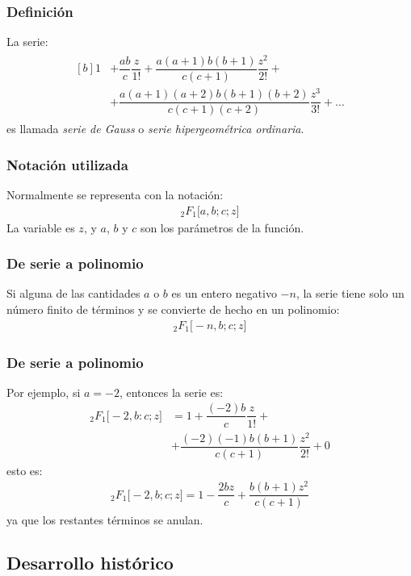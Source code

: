 \documentclass[12pt]{beamer}
\begin{document}
\begin{frame}
\frametitle{Definición}
La serie:
\pause
\begin{align}
\begin{aligned}[b]
1 &+ \dfrac{a b}{c} \dfrac{z}{1!} + \dfrac{a (a {+} 1) b (b {+} 1)}{c( c {+} 1)} \dfrac{z^{2}}{2!} + \\[0.5em]
&+ \dfrac{a (a {+} 1)(a {+} 2) b (b {+} 1)(b {+} 2)}{c (c {+} 1)(c {+} 2)} \dfrac{z^{3}}{3!} + \ldots
\end{aligned}
\label{eq:ecuacion_01_01_01}
\end{align}
es llamada \emph{serie de Gauss} o \emph{serie hipergeométrica ordinaria}.
\end{frame}
\begin{frame}
\frametitle{Notación utilizada}
Normalmente se representa con la notación:
\pause
\begin{align*}
{}_{2} F_{1} \big[ a, b; c; z \big]
\end{align*}
La variable es $z$, y $a$, $b$ y $c$ son los parámetros  de la función.
\end{frame}
\begin{frame}
\frametitle{De serie a polinomio}
Si alguna de las cantidades $a$ o $b$ es un entero negativo $-n$, la serie tiene solo un número finito de términos y se convierte de hecho en un polinomio:
\begin{align*}
{}_{2} F_{1} \big[ -n, b; c; z \big]
\end{align*}
\end{frame}
\begin{frame}
\frametitle{De serie a polinomio}
Por ejemplo, si $a = -2$, entonces la serie es:
\pause
\begin{align*}
{}_{2} F_{1} \big[ -2, b: c; z \big] &= 1 + \dfrac{(-2) b}{c} \dfrac{z}{1!} + \\[0.5em]
&+ \dfrac{(-2) (-1) b (b + 1)}{c( c + 1)} \dfrac{z^{2}}{2!} + 0 
\end{align*}    
esto es:
\pause
\begin{align}
{}_{2} F_{1} \big[ -2, b; c; z \big] = 1 - \dfrac{2 b z}{c} + \dfrac{b( b + 1) z^{2}}{c (c + 1)}
\label{eq:ecuacion_01_01_02}
\end{align}
ya que los restantes términos se anulan.
\end{frame}

\subsection{Desarrollo histórico}
\end{document}
